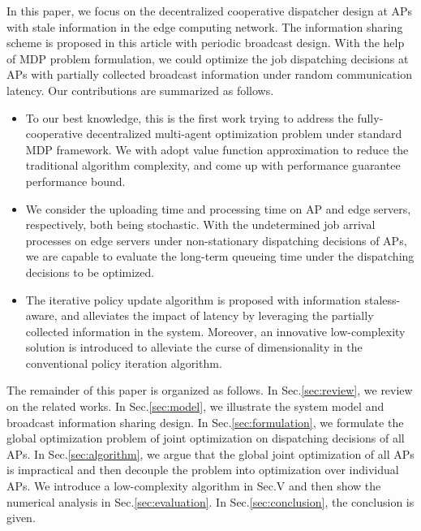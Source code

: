 In this paper, we focus on the decentralized cooperative dispatcher design at APs with stale information in the edge computing network.
The information sharing scheme is proposed in this article with periodic broadcast design.
With the help of MDP problem formulation, we could optimize the job dispatching decisions at APs with partially collected broadcast information under random communication latency.
Our contributions are summarized as follows.
\begin{itemize}
    \item To our best knowledge, this is the first work trying to address the fully-cooperative decentralized multi-agent optimization problem under standard MDP framework.
    We with adopt value function approximation to reduce the traditional algorithm complexity, and come up with performance guarantee performance bound.

    \item We consider the uploading time and processing time on AP and edge servers, respectively, both being stochastic.
    With the undetermined job arrival processes on edge servers under non-stationary dispatching decisions of APs, we are capable to evaluate the long-term queueing time under the dispatching decisions to be optimized.

    \item The iterative policy update algorithm is proposed with information staless-aware, and alleviates the impact of latency by leveraging the partially collected information in the system.
    Moreover, an innovative low-complexity solution is introduced to alleviate the curse of dimensionality in the conventional policy iteration algorithm.
\end{itemize}

The remainder of this paper is organized as follows.
In Sec.\ref{sec:review}, we review on the related works.
In Sec.\ref{sec:model}, we illustrate the system model and broadcast information sharing design.
In Sec.\ref{sec:formulation}, we formulate the global optimization problem of joint optimization on dispatching decisions of all APs.
In Sec.\ref{sec:algorithm}, we argue that the global joint optimization of all APs is impractical and then decouple the problem into optimization over individual APs.
We introduce a low-complexity algorithm in Sec.V and then show the numerical analysis in Sec.\ref{sec:evaluation}.
In Sec.\ref{sec:conclusion}, the conclusion is given.

